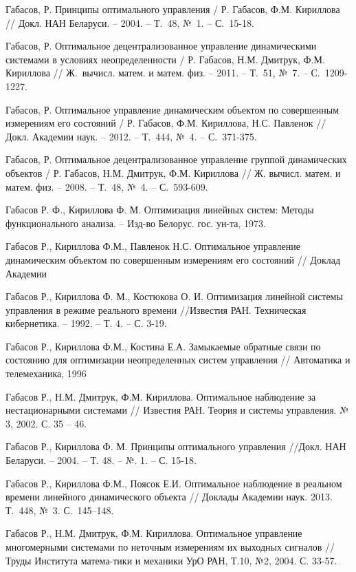 \begin{biblio}
Габасов, Р. Принципы оптимального управления / Р. Габасов,  Ф.М. Кириллова  // Докл. НАН Беларуси.
-- 2004. -- Т.~48, №~1. -- С.~15-18.

Габасов, Р. Оптимальное децентрализованное управление динамическими системами в условиях неопределенности / Р. Габасов, Н.М. Дмитрук, Ф.М. Кириллова // Ж.~вычисл. матем. и матем. физ. --
2011.  -- Т.~51, №~7. -- С.~1209-1227.

Габасов, Р. Оптимальное управление динамическим объектом по совершенным измерениям его состояний /
Р. Габасов,  Ф.М. Кириллова,  Н.С. Павленок  //  Докл. Академии наук. -- 2012.  -- Т.~444, №~4. --
С.~371-375.

Габасов, Р. Оптимальное децентрализованное управление группой динамических объектов / Р. Габасов, Н.М. Дмитрук, Ф.М. Кириллова // Ж. вычисл. матем. и матем. физ. -- 2008. -- Т.~48, №~4. --
С.~593-609.

Габасов Р. Ф., Кириллова Ф. М. Оптимизация линейных систем: Методы функционального анализа. – Изд-во Белорус. гос. ун-та, 1973.

Габасов Р., Кириллова Ф.М., Павленок Н.С. Оптимальное управление динамическим объектом по совершенным измерениям его состояний //  Доклад Академии

Габасов Р., Кириллова Ф. М., Костюкова О. И. Оптимизация линейной системы управления в режиме реального времени //Известия РАН. Техническая кибернетика. – 1992. – Т. 4. – С. 3-19.

Габасов Р., Кириллова Ф.М., Костина Е.А. Замыкаемые обратные связи по
состоянию для оптимизации неопределенных систем управления // Автоматика и
телемеханика, 1996

Габасов Р., Н.М. Дмитрук, Ф.М. Кириллова. Оптимальное наблюдение за нестационарными системами // Известия РАН. Теория и системы управления. № 3, 2002. С. 35 – 46.

Габасов Р., Кириллова Ф. М. Принципы оптимального управления //Докл. НАН Беларуси. – 2004. – Т. 48. – №. 1. – С. 15-18.

Габасов Р., Кириллова Ф.М., Поясок Е.И. Оптимальное
наблюдение в реальном времени линейного динамического объекта // Доклады Академии наук. 2013. Т.~448, №~3. С.~145--148.

Габасов Р., Н.М. Дмитрук, Ф.М. Кириллова. Оптимальное управление многомерными системами по неточным измерениям их выходных сигналов // Труды Института матема-тики и механики УрО РАН, Т.10, №2, 2004. С. 33-57.


\end{biblio}

